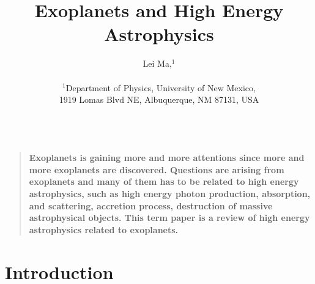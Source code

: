\documentclass[12pt]{article}
\title{Exoplanets and High Energy Astrophysics}
\author
{Lei Ma,$^{1}$\\
\\
\normalsize{$^{1}$Department of Physics, University of New Mexico,}\\
\normalsize{1919 Lomas Blvd NE, Albuquerque, NM 87131, USA}\\
\\
}
\date{}
\newenvironment{sciabstract}{%
\begin{quote} \bf}
{\end{quote}}
\begin{document}
 


\baselineskip24pt


\maketitle 




\begin{sciabstract}
  Exoplanets is gaining more and more attentions since more and more exoplanets are discovered. Questions are arising from exoplanets and many of them has to be related to high energy astrophysics, such as high energy photon production, absorption, and scattering, accretion process, destruction of massive astrophysical objects. This term paper is a review of high energy astrophysics related to exoplanets.
\end{sciabstract}





\section*{Introduction}
\end{document}
